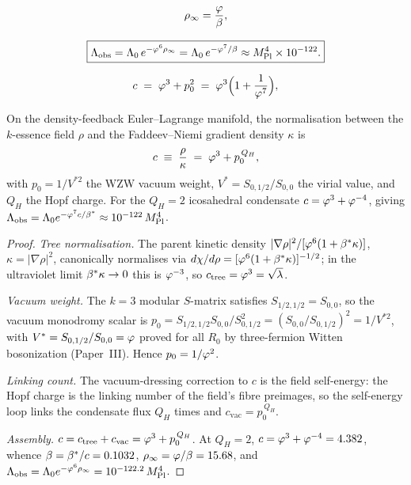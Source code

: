 

\begin{equation}
  \rho_{\infty} = \frac{\varphi}{\beta},
  \label{P7:eq:rho_inf}
\end{equation}

\begin{equation}
  \boxed{\Lambda_{\mathrm{obs}} = \Lambda_0\,e^{-\varphi^6\rho_{\infty}}
               = \Lambda_0\,e^{-\varphi^7/\beta}
               \approx M_{\mathrm{Pl}}^4\times10^{-122}.}
  \label{P7:eq:Lambda_obs}
\end{equation}

\begin{equation}
  c \;=\; \varphi^3 + p_0^2 \;=\; \varphi^3\Bigl(1+\frac{1}{\varphi^7}\Bigr),
  \label{P7:eq:cc_c}
\end{equation}

\begin{proposition}
\label{P7:prop:cc_norm}
On the density-feedback Euler--Lagrange manifold, the normalisation
between the $k$-essence field $\rho$ and the Faddeev--Niemi gradient
density $\kappa$ is
\begin{equation}
  c \;\equiv\; \frac{\rho}{\kappa} \;=\; \varphi^3 + p_0^{\,Q_H},
  \label{P7:eq:cc_norm}
\end{equation}
with $p_0 = 1/V^{*2}$ the WZW vacuum weight, $V^* = S_{0,1/2}/S_{0,0}$ the
virial value, and $Q_H$ the Hopf charge. For the $Q_H=2$ icosahedral
condensate $c = \varphi^3 + \varphi^{-4}$, giving
$\Lambda_{\mathrm{obs}} = \Lambda_0 e^{-\varphi^7 c/\beta^{*}}\approx10^{-122}\,M_{\mathrm{Pl}}^4$.
\end{proposition}

\begin{proof}
\emph{Tree normalisation.} The parent kinetic density
$|\nabla\rho|^2/[\varphi^6(1+\beta^{*}\kappa)]$, $\kappa=|\nabla\rho|^2$,
canonically normalises via $d\chi/d\rho=[\varphi^6(1+\beta^{*}\kappa)]^{-1/2}$;
in the ultraviolet limit $\beta^{*}\kappa\to0$ this is $\varphi^{-3}$, so
$c_{\mathrm{tree}}=\varphi^3=\sqrt{\lambda}$.

\emph{Vacuum weight.} The $k=3$ modular $S$-matrix satisfies
$S_{1/2,1/2}=S_{0,0}$, so the vacuum monodromy scalar is
$p_0=S_{1/2,1/2}S_{0,0}/S_{0,1/2}^2=(S_{0,0}/S_{0,1/2})^2=1/V^{*2}$,
with $V^*=S_{0,1/2}/S_{0,0}=\varphi$ proved for all $R_0$ by three-fermion
Witten bosonization (Paper~III). Hence $p_0=1/\varphi^2$.

\emph{Linking count.} The vacuum-dressing correction to $c$ is the
field self-energy: the Hopf charge is the linking number of the
field's fibre preimages, so the self-energy loop links the condensate
flux $Q_H$ times and $c_{\mathrm{vac}}=p_0^{\,Q_H}$.

\emph{Assembly.} $c=c_{\mathrm{tree}}+c_{\mathrm{vac}}=\varphi^3+p_0^{\,Q_H}$.
At $Q_H=2$, $c=\varphi^3+\varphi^{-4}=4.382$, whence $\beta=\beta^{*}/c=0.1032$,
$\rho_{\infty}=\varphi/\beta=15.68$, and $\Lambda_{\mathrm{obs}}=\Lambda_0e^{-\varphi^6\rho_{\infty}}=10^{-122.2}\,M_{\mathrm{Pl}}^4$.
\end{proof}

